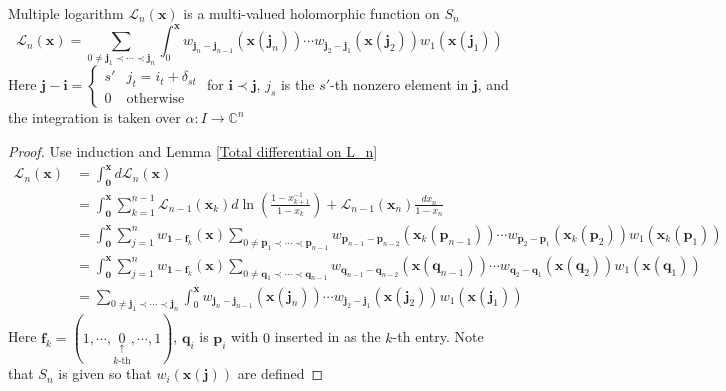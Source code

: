 \documentclass[main]{subfiles}
\begin{document}
\begin{theorem}
Multiple logarithm $\mathcal L_n(\mathbf x)$ is a multi-valued holomorphic function on $S_n$
\[\mathcal L_n(\mathbf x)=\sum_{0\neq\mathbf j_1\prec\cdots\prec\mathbf j_n}\int_0^{\mathbf x}w_{\mathbf j_{n}-\mathbf j_{n-1}}(\mathbf x(\mathbf j_{n}))\cdots w_{\mathbf j_{2}-\mathbf j_{1}}(\mathbf x(\mathbf j_{2}))w_{1}(\mathbf x(\mathbf j_{1}))\]
Here $\mathbf j-\mathbf i=\begin{cases}
s' &j_t=i_t+\delta_{st} \\
0 &\text{otherwise}
\end{cases}$ for $\mathbf i\prec\mathbf j$, $j_s$ is the $s'$-th nonzero element in $\mathbf j$, and the integration is taken over $\alpha:I\to\mathbb C^n$
\end{theorem}

\begin{proof}
Use induction and Lemma \ref{Total differential on L_n}
\begin{align*}
\mathcal L_n(\mathbf x)&=\int_{\mathbf0}^{\mathbf x}d\mathcal L_n(\mathbf x) \\
&=\int_{\mathbf0}^{\mathbf x}\sum_{k=1}^{n-1}\mathcal L_{n-1}(\mathbf x_k)d\ln\left(\frac{1-x_{k+1}^{-1}}{1-x_k}\right)+\mathcal L_{n-1}(\mathbf x_n)\frac{dx_n}{1-x_n} \\
&=\int_{\mathbf0}^{\mathbf x}\sum_{j=1}^{n}w_{\mathbf 1-\mathbf f_k}(\mathbf x)\sum_{0\neq\mathbf p_1\prec\cdots\prec\mathbf p_{n-1}}w_{\mathbf p_{n-1}-\mathbf p_{n-2}}(\mathbf x_k(\mathbf p_{n-1}))\cdots w_{\mathbf p_{2}-\mathbf p_{1}}(\mathbf x_k(\mathbf p_{2}))w_{1}(\mathbf x_k(\mathbf p_{1})) \\
&=\int_{\mathbf0}^{\mathbf x}\sum_{j=1}^{n}w_{\mathbf 1-\mathbf f_k}(\mathbf x)\sum_{0\neq\mathbf q_1\prec\cdots\prec\mathbf q_{n-1}}w_{\mathbf q_{n-1}-\mathbf q_{n-2}}(\mathbf x(\mathbf q_{n-1}))\cdots w_{\mathbf q_{2}-\mathbf q_{1}}(\mathbf x(\mathbf q_{2}))w_{1}(\mathbf x(\mathbf q_{1})) \\
&=\sum_{0\neq\mathbf j_1\prec\cdots\prec\mathbf j_n}\int_0^{\mathbf x}w_{\mathbf j_{n}-\mathbf j_{n-1}}(\mathbf x(\mathbf j_{n}))\cdots w_{\mathbf j_{2}-\mathbf j_{1}}(\mathbf x(\mathbf j_{2}))w_{1}(\mathbf x(\mathbf j_{1}))
\end{align*}
Here $\mathbf f_k=(1,\cdots,\underset{k\text{-th}}{\underset\uparrow0},\cdots,1)$, $\mathbf q_i$ is $\mathbf p_i$ with $0$ inserted in as the $k$-th entry. Note that $S_n$ is given so that $w_i(\mathbf x(\mathbf j))$ are defined
\end{proof}
\end{document}
